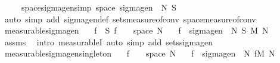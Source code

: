 \begin{isabellebody}
\ \ \ \ \ space{\isacharunderscore}{\kern0pt}sigma{\isacharunderscore}{\kern0pt}gen{\isacharbrackleft}{\kern0pt}simp{\isacharbrackright}{\kern0pt}{\isacharcolon}{\kern0pt}\ {\isachardoublequoteopen}space\ {\isacharparenleft}{\kern0pt}sigma{\isacharunderscore}{\kern0pt}gen\ {\isasymOmega}\ N\ S{\isacharparenright}{\kern0pt}\ {\isacharequal}{\kern0pt}\ {\isasymOmega}{\isachardoublequoteclose}\isanewline
%
\isadelimproof
\ \ %
\endisadelimproof
%
\isatagproof
{}\isamarkupfalse%
\ {\isacharparenleft}{\kern0pt}auto\ simp\ add{\isacharcolon}{\kern0pt}\ sigma{\isacharunderscore}{\kern0pt}gen{\isacharunderscore}{\kern0pt}def\ sets{\isacharunderscore}{\kern0pt}measure{\isacharunderscore}{\kern0pt}of{\isacharunderscore}{\kern0pt}conv\ space{\isacharunderscore}{\kern0pt}measure{\isacharunderscore}{\kern0pt}of{\isacharunderscore}{\kern0pt}conv{\isacharparenright}{\kern0pt}%
\endisatagproof
{\isafoldproof}%
%
\isadelimproof
\isanewline
%
\endisadelimproof
\isanewline
{}\isamarkupfalse%
\ measurable{\isacharunderscore}{\kern0pt}sigma{\isacharunderscore}{\kern0pt}gen{\isacharcolon}{\kern0pt}\isanewline
\ \ \ {\isachardoublequoteopen}f\ {\isasymin}\ S{\isachardoublequoteclose}\ {\isachardoublequoteopen}f\ {\isasymin}\ {\isasymOmega}\ {\isasymrightarrow}\ space\ N{\isachardoublequoteclose}\isanewline
\ \ \ {\isachardoublequoteopen}f\ {\isasymin}\ sigma{\isacharunderscore}{\kern0pt}gen\ {\isasymOmega}\ N\ S\ {\isasymrightarrow}\isactrlsub M\ N{\isachardoublequoteclose}\isanewline
%
\isadelimproof
\ \ %
\endisadelimproof
%
\isatagproof
{}\isamarkupfalse%
\ assms\ \isamarkupfalse%
\ {\isacharparenleft}{\kern0pt}intro\ measurableI{\isacharcomma}{\kern0pt}\ auto\ simp\ add{\isacharcolon}{\kern0pt}\ sets{\isacharunderscore}{\kern0pt}sigma{\isacharunderscore}{\kern0pt}gen{\isacharparenright}{\kern0pt}%
\endisatagproof
{\isafoldproof}%
%
\isadelimproof
\isanewline
%
\endisadelimproof
\isanewline
{}\isamarkupfalse%
\ measurable{\isacharunderscore}{\kern0pt}sigma{\isacharunderscore}{\kern0pt}gen{\isacharunderscore}{\kern0pt}singleton{\isacharcolon}{\kern0pt}\isanewline
\ \ \ {\isachardoublequoteopen}f\ {\isasymin}\ {\isasymOmega}\ {\isasymrightarrow}\ space\ N{\isachardoublequoteclose}\isanewline
\ \ \ {\isachardoublequoteopen}f\ {\isasymin}\ sigma{\isacharunderscore}{\kern0pt}gen\ {\isasymOmega}\ N\ {\isacharbraceleft}{\kern0pt}f{\isacharbraceright}{\kern0pt}{\isasymrightarrow}\isactrlsub M\ N{\isachardoublequoteclose}\isanewline

\end{isabellebody}
